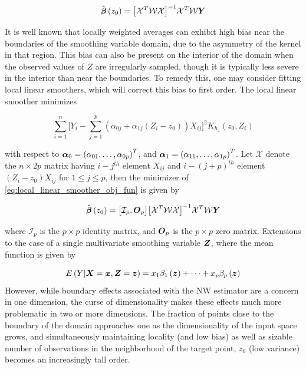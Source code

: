 \documentclass[12pt]{article}
\newcommand{\bfbeta}{\mbox{\boldmath $\beta$}}
\newcommand{\bfalpha}{\mbox{\boldmath $\alpha$}}
\newcommand{\bfO}{\mbox{\boldmath $O$}}
\newcommand{\bfx}{\mbox{\boldmath $x$}}
\newcommand{\bfX}{\mbox{\boldmath $X$}}
\newcommand{\bfz}{\mbox{\boldmath $z$}}
\newcommand{\bfY}{\mbox{\boldmath $Y$}}
\newcommand{\bfZ}{\mbox{\boldmath $Z$}}
\begin{document}
\begin{equation} \nonumber
\hat{\bfbeta}\left(z_0\right) = \big[\mathcal{X}^T\mathcal{W}\mathcal{X}\big]^{-1} \mathcal{X}^T\mathcal{W} \bfY
\end{equation} 


It is well known that locally weighted averages can exhibit high bias near the boundaries of the smoothing variable domain, due to the asymmetry of the kernel in that region. This bias can also be present on the interior of the domain when the observed values of $Z$ are irregularly sampled, though it is typically less severe in the interior than near the boundaries. To remedy this, one may consider fitting local linear smoothers, which will correct this bias to first order. The local linear smoother minimizes 

\begin{equation} \label{local_linear_smoother_obj_fun} 
\sum_{i=1}^n \Big[Y_i - \sum_{j=1}^p \left(\alpha_{0j}+\alpha_{1j}\left(Z_i - z_0 \right)\right)X_{ij}\Big]^2 K_{h_z}\left(z_0,Z_i\right)
\end{equation} 
 
 \noindent
 with respect to $\bfalpha_0 = \left( \alpha_{01}, \dots, \alpha_{0p}\right)^T$, and $\bfalpha_1 = \left( \alpha_{11}, \dots, \alpha_{1p}\right)^T$. Let $\mathcal{X}$ denote the $n \times 2p$ matrix having $i-j^{th}$ element $X_{ij}$ and $i-\left(j+p\right)^{th}$ element $\left(Z_i - z_0\right)X_{ij}$ for $1 \le  j \le p$, then the minimizer of \ref{eq:local_linear_smoother_obj_fun} is given by 
 
\begin{equation} \nonumber
\hat{\bfbeta}\left(z_0\right) = \big[ \mathcal{I}_p, \bfO_p \big]\big[\mathcal{X}^T\mathcal{W}\mathcal{X}\big]^{-1} \mathcal{X}^T\mathcal{W} \bfY
\end{equation}   

\noindent
where $\mathcal{I}_p$ is the $p \times p$ identity matrix, and $\bfO_p$ is the $p \times p$ zero matrix. Extensions to the case of a single multivariate smoothing variable $\bfZ$, where the mean function is given by 

\[
E\left(Y \vert \bfX=\bfx, \bfZ=\bfz \right) = x_1\beta_1\left(\bfz\right) + \dots  + x_p\beta_p\left(\bfz\right)
\]
\noindent
However, while boundary effects associated with the NW estimator are a concern in one dimension, the curse of dimensionality makes these effects much more problematic in two or more dimensions. The fraction of points close to the boundary of the domain approaches one as the dimensionality of the input space grows, and simultaneously maintaining locality (and low bias) as well as sizable number of observations in the neighborhood of the target point, $z_0$ (low variance) becomes an increasingly tall order. 
\end{document}
